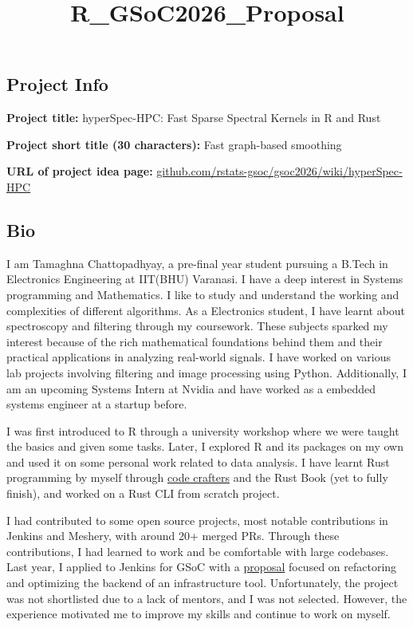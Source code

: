 \documentclass[11pt]{article}
\title{R\_GSoC2026\_Proposal}
\begin{document}
    
    \maketitle
    
    

    
    \hypertarget{project-info}{%
\subsection{Project Info}\label{project-info}}

\textbf{Project title:} hyperSpec-HPC: Fast Sparse Spectral Kernels in R
and Rust

\textbf{Project short title (30 characters):} Fast graph-based smoothing

\textbf{URL of project idea page:}
\url{github.com/rstats-gsoc/gsoc2026/wiki/hyperSpec‐HPC}

    \hypertarget{bio}{%
\subsection{Bio}\label{bio}}

I am Tamaghna Chattopadhyay, a pre-final year student pursuing a B.Tech
in Electronics Engineering at IIT(BHU) Varanasi. I have a deep interest
in Systems programming and Mathematics. I like to study and understand
the working and complexities of different algorithms. As a Electronics
student, I have learnt about spectroscopy and filtering through my
coursework. These subjects sparked my interest because of the rich
mathematical foundations behind them and their practical applications in
analyzing real-world signals. I have worked on various lab projects
involving filtering and image processing using Python. Additionally, I
am an upcoming Systems Intern at Nvidia and have worked as a embedded
systems engineer at a startup before.

I was first introduced to R through a university workshop where we were
taught the basics and given some tasks. Later, I explored R and its
packages on my own and used it on some personal work related to data
analysis. I have learnt Rust programming by myself through
\href{https://app.codecrafters.io/tracks/rust}{code crafters} and the
Rust Book (yet to fully finish), and worked on a Rust CLI from scratch
project.

I had contributed to some open source projects, most notable
contributions in Jenkins and Meshery, with around 20+ merged PRs.
Through these contributions, I had learned to work and be comfortable
with large codebases. Last year, I applied to Jenkins for GSoC with a
\href{https://drive.google.com/file/d/1NjQ4nWY_jHtc0QaP2AHDvc2LqZ3Bvswv/view?usp=sharing}{proposal}
focused on refactoring and optimizing the backend of an infrastructure
tool. Unfortunately, the project was not shortlisted due to a lack of
mentors, and I was not selected. However, the experience motivated me to
improve my skills and continue to work on myself.
\end{document}
